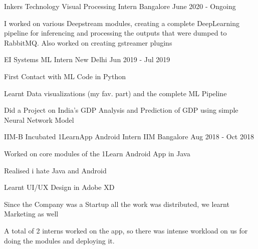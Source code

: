 \begin{cventries}

\cventry
    {Inkers Technology}
    {Visual Processing Intern}
    {Bangalore}
    {June 2020 - Ongoing}
    {
        \begin{cvitems}
            \item {I worked on various Deepstream modules, creating a complete DeepLearning pipeline for inferencing and processing the outputs that were dumped to RabbitMQ.
            Also worked on creating gstreamer plugins}
        \end{cvitems}
    }

\cventry
    {EI Systems}
    {ML Intern}
    {New Delhi}
    {Jun 2019 - Jul 2019}
    {
        \begin{cvitems}
            \item {First Contact with ML Code in Python}
            \item {Learnt Data visualizations (my fav. part) and the complete ML Pipeline}
            \item {Did a Project on India's GDP Analysis and Prediction of GDP using simple Neural Network Model}
        \end{cvitems}
    }

\cventry
    {IIM-B Incubated}
    {1LearnApp Android Intern}
    {IIM Bangalore}
    {Aug 2018 - Oct 2018}
    {
        \begin{cvitems}
            \item {Worked on core modules of the 1Learn Android App in Java}
            \item {Realised i hate Java and Android}
            \item {Learnt UI/UX Design in Adobe XD}
            \item {Since the Company was a Startup all the work was distributed, we learnt Marketing as well}
            \item {A total of 2 interns worked on the app, so there was intense workload on us for doing the
    modules and deploying it.}
        \end{cvitems}
    }


\end{cventries}